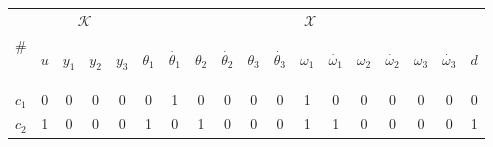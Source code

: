 \documentclass[a4,11pt]{article}
\begin{document}
\begin{table}[!htb]
\centering
\normalsize
\begin{tabular}{|l|cccc|ccccccccccccc|}
\hline
&\multicolumn{4}{c|}{$\mathcal{K}$} & \multicolumn{13}{|c|}{$\mathcal{X}$}\\
\cline{2-18}
\# & \begin{sideways}$u$\end{sideways}& \begin{sideways}$y_1$\end{sideways}& \begin{sideways}$y_2$\end{sideways}& \begin{sideways}$y_3$\end{sideways}& \begin{sideways}$\theta_1$\end{sideways}& \begin{sideways}$\dot{\theta_1}$\end{sideways}& \begin{sideways}$\theta_2$\end{sideways}& \begin{sideways}$\dot{\theta_2}$\end{sideways}& \begin{sideways}$\theta_3$\end{sideways}& \begin{sideways}$\dot{\theta_3}$\end{sideways}& \begin{sideways}$\omega_1$\end{sideways}& \begin{sideways}$\dot{\omega_1}$\end{sideways}& \begin{sideways}$\omega_2$\end{sideways}& \begin{sideways}$\dot{\omega_2}$\end{sideways}& \begin{sideways}$\omega_3$\end{sideways}& \begin{sideways}$\dot{\omega_3}$\end{sideways}& \begin{sideways}$d$\end{sideways} \\ 
\hline
$c_1$  & 0 & 0 & 0 & 0 & 0 & 1 & 0 & 0 & 0 & 0 & 1 & 0 & 0 & 0 & 0 & 0 & 0 \\ 
$c_2$  & 1 & 0 & 0 & 0 & 1 & 0 & 1 & 0 & 0 & 0 & 1 & 1 & 0 & 0 & 0 & 0 & 1 \\ 

\end{tabular}
\end{table}
\end{document}
